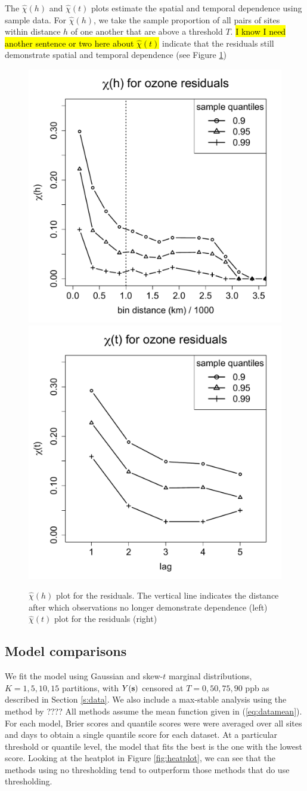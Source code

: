 \documentclass[11pt]{article}
\begin{document}
The $\widehat{\chi}(h)$ and $\widehat{\chi}(t)$ plots estimate the spatial and temporal dependence using sample data.
For $\widehat{\chi}(h)$, we take the sample proportion of all pairs of sites within distance $h$ of one another that are above a threshold $T$.
\hl{I know I need another sentence or two here about $\widehat{\chi}(t)$}
indicate that the residuals still demonstrate spatial and temporal dependence (see Figure \ref{fig:chi-st})
\begin{center}
\begin{figure}
  \includegraphics[width=0.5\linewidth]{plots/chi-h-ozone.pdf}
  \includegraphics[width=0.5\linewidth]{plots/chi-t-ozone.pdf}
  \caption{$\widehat{\chi}(h)$ plot for the residuals. The vertical line indicates the distance after which observations no longer demonstrate dependence (left) $\widehat{\chi}(t)$ plot for the residuals (right)}
  \label{fig:chi-st}
\end{figure}
\end{center}

\subsection{Model comparisons}
We fit the model using Gaussian and skew-$t$ marginal distributions, $K=1, 5, 10, 15$ partitions, with $Y(\mbox{\bf s})$ censored at $T = 0, 50, 75, 90$ ppb as described in Section \ref{s:data}.
We also include a max-stable analysis using the method by ????
All methods assume the mean function given in (\ref{eq:datamean}).
For each model, Brier scores and quantile scores were were averaged over all sites and days to obtain a single quantile score for each dataset.
At a particular threshold or quantile level, the model that fits the best is the one with the lowest score.
Looking at the heatplot in Figure \ref{fig:heatplot}, we can see that the methods using no thresholding tend to outperform those methods that do use thresholding.
\end{document}
